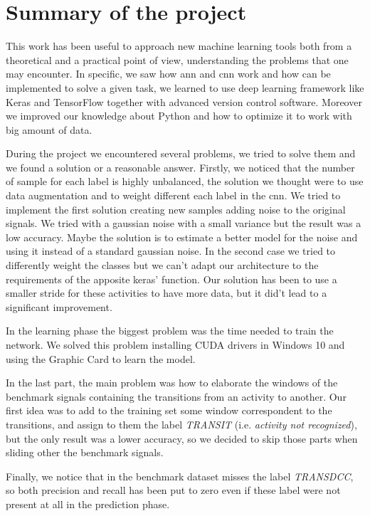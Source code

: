 
\section{Summary of the project}
\label{sec:summary}
This work has been useful to approach new machine learning tools both from a theoretical and a practical point of view, understanding the problems that one may encounter.
In specific, we saw how \gls{ann} and \gls{cnn} work and how can be implemented to solve a given task, we learned to use deep learning framework like Keras and TensorFlow together with advanced version control software. Moreover we improved our knowledge about Python and how to optimize it to work with big amount of data.

During the project we encountered several problems, we tried to solve them and we found a solution or a reasonable answer.
Firstly, we noticed that the number of sample for each label is highly unbalanced, the solution we thought were to use data augmentation and to weight different each label in the \gls{cnn}. We tried to implement the first solution creating new samples adding noise to the original signals. We tried with a gaussian noise with a small variance but the result was a low accuracy. Maybe the solution is to estimate a better model for the noise and using it instead of a standard gaussian noise.
In the second case we tried to differently weight the classes but we can't adapt our architecture to the requirements of the apposite keras' function.
Our solution has been to use a smaller stride for these activities to have more data, but it did't lead to a significant improvement.

In the learning phase the biggest problem was the time needed to train the network. We solved this problem installing CUDA drivers in Windows 10 and using the Graphic Card to learn the model.

In the last part, the main problem was how to elaborate the windows of the benchmark signals containing the transitions from an activity to another. Our first idea was to add to the training set some window correspondent to the transitions, and assign to them the label \textit{TRANSIT} (i.e. \textit{activity not recognized}), but the only result was a lower accuracy, so we decided to skip those parts when sliding other the benchmark signals.

Finally, we notice that in the benchmark dataset misses the label \textit{TRANSDCC}, so both precision and recall has been put to zero even if these label were not present at all in the prediction phase.

